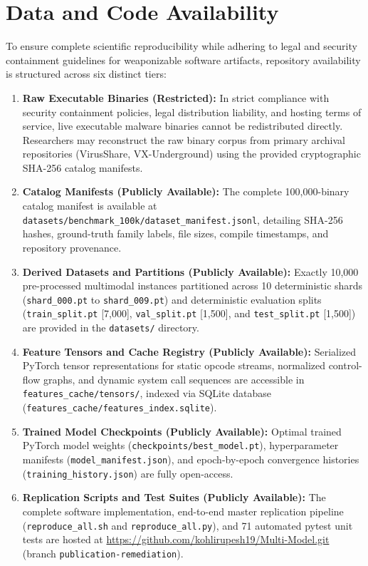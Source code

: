 \documentclass[pdflatex,sn-mathphys-num]{sn-jnl}
\begin{document}
\section{Data and Code Availability}\label{sec:availability}
To ensure complete scientific reproducibility while adhering to legal and security containment guidelines for weaponizable software artifacts, repository availability is structured across six distinct tiers:
\begin{enumerate}
    \item \textbf{Raw Executable Binaries (Restricted):} In strict compliance with security containment policies, legal distribution liability, and hosting terms of service, live executable malware binaries cannot be redistributed directly. Researchers may reconstruct the raw binary corpus from primary archival repositories (VirusShare, VX-Underground) using the provided cryptographic SHA-256 catalog manifests.
    \item \textbf{Catalog Manifests (Publicly Available):} The complete 100,000-binary catalog manifest is available at \texttt{datasets/benchmark\_100k/dataset\_manifest.jsonl}, detailing SHA-256 hashes, ground-truth family labels, file sizes, compile timestamps, and repository provenance.
    \item \textbf{Derived Datasets and Partitions (Publicly Available):} Exactly 10,000 pre-processed multimodal instances partitioned across 10 deterministic shards (\texttt{shard\_000.pt} to \texttt{shard\_009.pt}) and deterministic evaluation splits (\texttt{train\_split.pt} [7,000], \texttt{val\_split.pt} [1,500], and \texttt{test\_split.pt} [1,500]) are provided in the \texttt{datasets/} directory.
    \item \textbf{Feature Tensors and Cache Registry (Publicly Available):} Serialized PyTorch tensor representations for static opcode streams, normalized control-flow graphs, and dynamic system call sequences are accessible in \texttt{features\_cache/tensors/}, indexed via SQLite database (\texttt{features\_cache/features\_index.sqlite}).
    \item \textbf{Trained Model Checkpoints (Publicly Available):} Optimal trained PyTorch model weights (\texttt{checkpoints/best\_model.pt}), hyperparameter manifests (\texttt{model\_manifest.json}), and epoch-by-epoch convergence histories (\texttt{training\_history.json}) are fully open-access.
    \item \textbf{Replication Scripts and Test Suites (Publicly Available):} The complete software implementation, end-to-end master replication pipeline (\texttt{reproduce\_all.sh} and \texttt{reproduce\_all.py}), and 71 automated pytest unit tests are hosted at \url{https://github.com/kohlirupesh19/Multi-Model.git} (branch \texttt{publication-remediation}).
\end{enumerate}
\end{document}

